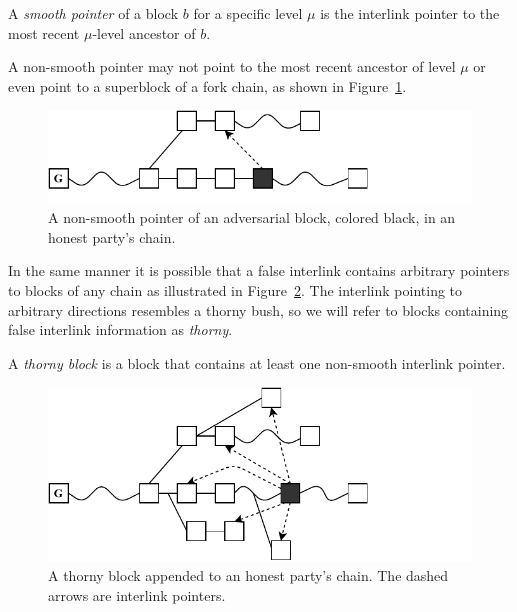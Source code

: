 \begin{definition}
  A \emph{smooth pointer} of a block $b$ for a specific level $\mu$ is the interlink pointer to the most recent $\mu$-level ancestor of $b$.
	\label{defn:smooth_pointer}
\end{definition}

A non-smooth pointer may not point to the most recent ancestor of level $\mu$ or even point to a superblock of a fork chain, as shown in Figure~\ref{fig:false_interlink}.

\begin{figure}[h]
	\begin{center}
		\includegraphics[width=0.9\columnwidth]{figures/false_interlink.pdf}
	\end{center}
    \caption{A non-smooth pointer of an adversarial block, colored black, in an honest party's chain.}
	\label{fig:false_interlink}
\end{figure}

In the same manner it is possible that a false interlink contains arbitrary pointers to blocks of any chain as illustrated in Figure~\ref{fig:thorny_block}. The interlink pointing to arbitrary directions resembles a thorny bush, so we will refer to blocks containing false interlink information as \emph{thorny}.

\begin{definition}
	A \emph{thorny block} is a block that contains at least one non-smooth interlink pointer.
	\label{defn:thorny_block}
\end{definition}

\begin{figure}[h]
	\begin{center}
		\includegraphics[width=0.9\columnwidth]{figures/thorny_block.pdf}
	\end{center}
	\caption{A thorny block appended to an honest party's chain.
	The dashed arrows are interlink pointers.}
	\label{fig:thorny_block}
\end{figure}

